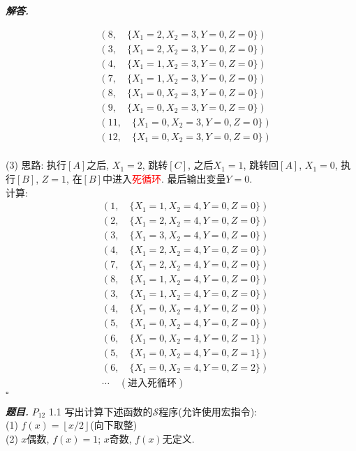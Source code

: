 \documentclass[10pt, a4paper, oneside]{ctexart}
\newenvironment{problem}{\begin{framed}\par\noindent\textbf{\textit{题目. }}}{\end{framed}\par}
\newenvironment{solution}{%
  \par\noindent\textbf{\textit{解答. }}\ignorespaces
}{%
  \hfill\ensuremath{\square}\par
}
\begin{document}
\begin{solution}
\begin{align*}
    &(8, \quad \{X_1=2,X_2=3,Y=0,Z=0\})\\
    &(3, \quad \{X_1=2,X_2=3,Y=0,Z=0\})\\
    &(4, \quad \{X_1=1,X_2=3,Y=0,Z=0\})\\
    &(7, \quad \{X_1=1,X_2=3,Y=0,Z=0\})\\
    &(8, \quad \{X_1=0,X_2=3,Y=0,Z=0\})\\
    &(9, \quad \{X_1=0,X_2=3,Y=0,Z=0\})\\
    &(11, \quad \{X_1=0,X_2=3,Y=0,Z=0\})\\
    &(12, \quad \{X_1=0,X_2=3,Y=0,Z=0\})
    \end{align*}
    \\(3) 思路: 执行$[A]$之后, $X_1=2$, 跳转$[C]$, 之后$X_1=1$, 跳转回$[A]$, $X_1=0$, 执行$[B]$, $Z=1$, 在$[B]$中进入\textcolor{red}{死循环}. 最后输出变量$Y=0$.\\
    计算: 
    \begin{align*}
    &(1, \quad \{X_1=1,X_2=4,Y=0,Z=0\})\\
    &(2, \quad \{X_1=2,X_2=4,Y=0,Z=0\})\\
    &(3, \quad \{X_1=3,X_2=4,Y=0,Z=0\})\\
    &(4, \quad \{X_1=2,X_2=4,Y=0,Z=0\})\\
    &(7, \quad \{X_1=2,X_2=4,Y=0,Z=0\})\\
    &(8, \quad \{X_1=1,X_2=4,Y=0,Z=0\})\\
    &(3, \quad \{X_1=1,X_2=4,Y=0,Z=0\})\\
    &(4, \quad \{X_1=0,X_2=4,Y=0,Z=0\})\\
    &(5, \quad \{X_1=0,X_2=4,Y=0,Z=0\})\\
    &(6, \quad \{X_1=0,X_2=4,Y=0,Z=1\})\\
    &(5, \quad \{X_1=0,X_2=4,Y=0,Z=1\})\\
    &(6, \quad \{X_1=0,X_2=4,Y=0,Z=2\})\\
    &\cdots \quad (\text{进入死循环})
    \end{align*}
    \end{solution}
    
    \begin{problem}
    $P_{12}$ 1.1 写出计算下述函数的$\mathscr{S}$程序(允许使用宏指令):\\
    (1) $f(x)=\left\lfloor x/2 \right\rfloor$(向下取整)\\
    (2) $x$偶数, $f(x)=1$; $x$奇数, $f(x)$无定义.
    \end{problem}
    
\end{document}
